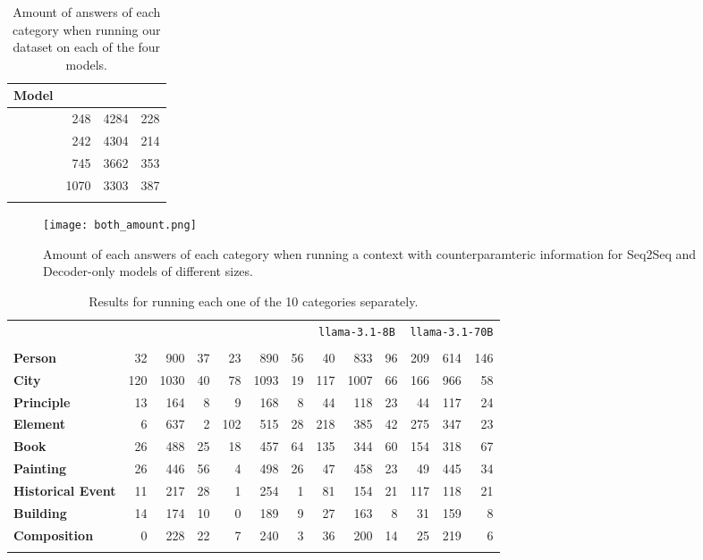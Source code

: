 \begin{table}[th]
	\centering
	\footnotesize
	\begin{tabular}{l r r r}
		\toprule
			\bfseries Model & \Pc{} & \Cc{} & \Oc{} \\
		\midrule
			\smallflan{}  & 248 & 4284 & 228 \\
			\bigflan{} & 242 & 4304 & 214 \\
		\midrule
			\smallllama{} & 745 & 3662 & 353 \\
			\bigllama{} & 1070 & 3303 & 387 \\
		\bottomrule \addlinespace[4pt]
	\end{tabular}
	\caption{Amount of answers of each category when running our dataset on each of the four models.}
	\label{total_table}
\end{table}

\begin{figure}[th]
	\centering
	\texttt{[image: both\_amount.png]}
	\caption{Amount of each answers of each category when running a context with counterparamteric information for Seq2Seq and Decoder-only models of different sizes.}
	\label{total_plot}
\end{figure}

\begin{table*}[t]
	\centering
	\footnotesize
	\begin{tabular}{>{\bfseries}l | r r r | r r r | r r r | r r r}
		\toprule
			& \multicolumn{3}{c|}{\smallflan{}} & \multicolumn{3}{c|}{\bigflan{}} & \multicolumn{3}{c|}{\texttt{llama-3.1-8B}} & \multicolumn{3}{c}{\texttt{llama-3.1-70B}}  \\
			& \Pc{} & \Cc{} & \Oc{} & \Pc{} & \Cc{} & \Oc{} & \Pc{} & \Cc{} & \Oc{} & \Pc{} & \Cc{} & \Oc{}  \\
		\midrule
			Person           &  32 &  900 & 37 &  23 &  890 & 56 &  40 &  833 & 96 & 209 & 614 & 146 \\
			City             & 120 & 1030 & 40 &  78 & 1093 & 19 & 117 & 1007 & 66 & 166 & 966 &  58 \\
			Principle        &  13 &  164 &  8 &   9 &  168 &  8 &  44 &  118 & 23 &  44 & 117 &  24 \\
			Element          &   6 &  637 &  2 & 102 &  515 & 28 & 218 &  385 & 42 & 275 & 347 &  23 \\
			Book             &  26 &  488 & 25 &  18 &  457 & 64 & 135 &  344 & 60 & 154 & 318 &  67 \\
			Painting         &  26 &  446 & 56 &   4 &  498 & 26 &  47 &  458 & 23 &  49 & 445 &  34 \\
			Historical Event &  11 &  217 & 28 &   1 &  254 &  1 &  81 &  154 & 21 & 117 & 118 &  21 \\
			Building         &  14 &  174 & 10 &   0 &  189 &  9 &  27 &  163 &  8 &  31 & 159 &   8 \\
			Composition      &   0 &  228 & 22 &   7 &  240 &  3 &  36 &  200 & 14 &  25 & 219 &   6 \\
		\bottomrule \addlinespace[4pt]
	\end{tabular}
	\caption{Results for running each one of the 10 categories separately. }
	\label{cats_table}
\end{table*}
